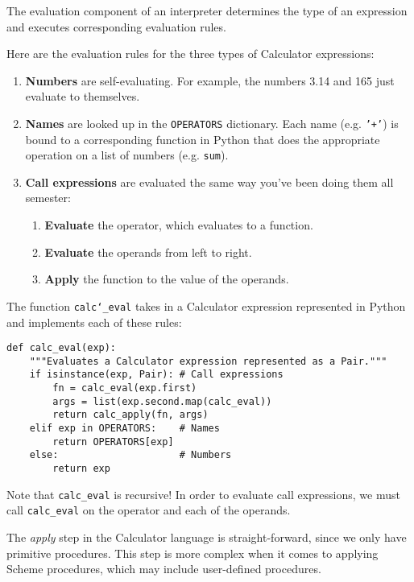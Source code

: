 The evaluation component of an interpreter determines the type of an expression
and executes corresponding evaluation rules.

Here are the evaluation rules for the three types of Calculator expressions:

\begin{enumerate}[1.]
    \item \textbf{Numbers} are self-evaluating. For example, the numbers 3.14
    and 165 just evaluate to themselves.

    \item \textbf{Names} are looked up in the \texttt{OPERATORS} dictionary.
    Each name (e.g. \texttt{'+'}) is bound to a corresponding function in Python
    that does the appropriate operation on a list of numbers (e.g. \texttt{sum}).

    \item \textbf{Call expressions} are evaluated the same way you've been
    doing them all semester:
        \begin{enumerate}[(1)]
            \item \textbf{Evaluate} the operator, which evaluates to a function.
            \item \textbf{Evaluate} the operands from left to right.
            \item \textbf{Apply} the function to the value of the operands.
        \end{enumerate}
\end{enumerate}

\begin{minipage}{\textwidth}
The function {\tt calc\char`_eval} takes in a Calculator expression represented
in Python and implements each of these rules:
\begin{lstlisting}
def calc_eval(exp):
    """Evaluates a Calculator expression represented as a Pair."""
    if isinstance(exp, Pair): # Call expressions
        fn = calc_eval(exp.first)
        args = list(exp.second.map(calc_eval))
        return calc_apply(fn, args)
    elif exp in OPERATORS:    # Names
        return OPERATORS[exp]
    else:                     # Numbers
        return exp
\end{lstlisting}
\end{minipage}

Note that \texttt{calc\_eval} is recursive! In order to evaluate call
expressions, we must call \texttt{calc\_eval} on the operator and each of the
operands.

The \textit{apply} step in the Calculator language is straight-forward, since we only
have primitive procedures. This step is more complex when it comes to
applying Scheme procedures, which may include user-defined procedures.


